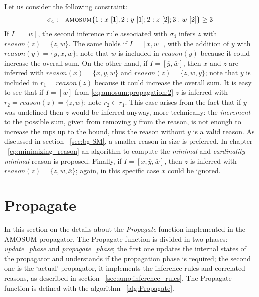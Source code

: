 \begin{example}\label{ex:amosum:propagation:more-2}
    Let us consider the following constraint:
    \begin{align*}
    \begin{array}{rl}
        \sigma_{4}: & \textsc{amosum}\{
            1 : x\ [1]; 2 : y\ [1]; 2 : z\ [2]; 3 : w\ [2]
        \} \geq 3
    \end{array}
    \end{align*}
    If $I = [\overline{w}]$, the second inference rule associated with $\sigma_4$ infers $z$ with $\mathit{reason}(z) = \{z, w\}$.
    The same holds if $I = [\overline{x}, \overline{w}]$, with the addition of $y$ with $\mathit{reason}(y) = \{y, x, w\}$;
    note that $w$ is included in $\mathit{reason}(y)$ because it could increase the overall sum.
    On the other hand, if $I = [\overline{y}, \overline{w}]$, then $x$ and $z$ are inferred with 
    $\mathit{reason}(x) = \{x, y, w\}$ and
    $\mathit{reason}(z) = \{z, w, y\}$;
    note that $y$ is included in $r_1 = \mathit{reason}(z)$ because it could increase the overall sum. 
    It is easy to see that if $I = [\overline{w}]$
    from \eqref{eq:amosum:propagation:2} $z$ is inferred with $r_2 = \mathit{reason}(z) = \{z, w\}$;
    note $r_2 \subset r_1$. This case arises from the fact that if $y$ was undefined then 
    $z$ would be inferred anyway, more technically: the \textit{increment} to the possible 
    sum, given from removing $y$ from the reason, is not enough to increase the mps up to the bound, thus 
    the reason without $y$ is a valid reason.
    As discussed in section ~\ref{sec:bg-SM}, a smaller reason in size is preferred.
    In chapter ~\ref{cp:minimizing_reason} an algorithm to compute the \textit{minimal} and 
    \textit{cardinality minimal} reason is proposed.
    Finally, if $I = [x, \overline{y}, \overline{w}]$, then $z$ is inferred with $\mathit{reason}(z) = \{z, w, \overline{x}\}$;
    again, in this specific case $x$ could be ignored.
    \end{example}
    

\section{Propagate}
\label{sec:amo:propagator}

In this section on the details about the \textit{Propagate} function implemented in the AMOSUM 
propagator.
The Propagate function is divided in two phases: \textit{update\_phase} and \textit{propagate\_phase};
the first one updates the internal states of the propagator and understands if the propagation phase is 
required; the second one is the `actual' propagator, it implements the inference rules and 
correlated reasons, as described in section ~\ref{sec:amo:inference_rules}.
The Propagate function is defined with the algorithm ~\ref{alg:Propagate}.




